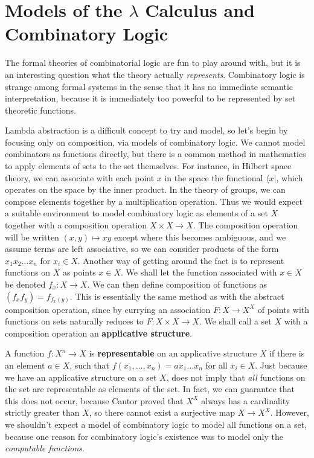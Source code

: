 \section{Models of the $\lambda$ Calculus and Combinatory Logic}

The formal theories of combinatorial logic are fun to play around with, but it is an interesting question what the theory actually {\it represents}. Combinatory logic is strange among formal systems in the sense that it has no immediate semantic interpretation, because it is immediately too powerful to be represented by set theoretic functions.

Lambda abstraction is a difficult concept to try and model, so let's begin by focusing only on composition, via models of combinatory logic. We cannot model combinators as functions directly, but there is a common method in mathematics to apply elements of sets to the set themselves. For instance, in Hilbert space theory, we can associate with each point $x$ in the space the functional $\langle x |$, which operates on the space by the inner product. In the theory of groups, we can compose elements together by a multiplication operation. Thus we would expect a suitable environment to model combinatory logic as elements of a set $X$ together with a composition operation $X \times X \to X$. The composition operation will be written $(x,y) \mapsto xy$ except where this becomes ambiguous, and we assume terms are left associative, so we can consider products of the form $x_1 x_2 \dots x_n$ for $x_i \in X$. Another way of getting around the fact is to represent functions on $X$ as points $x \in X$. We shall let the function associated with $x \in X$ be denoted $f_x : X \to X$. We can then define composition of functions as $(f_x f_y) = f_{f_x(y)}$. This is essentially the same method as with the abstract composition operation, since by currying an association $F: X \to X^X$ of points with functions on sets naturally reduces to $F: X \times X \to X$. We shall call a set $X$ with a composition operation an {\bf applicative structure}.

A function $f: X^n \to X$ is {\bf representable} on an applicative structure $X$ if there is an element $a \in X$, such that $f(x_1, \dots, x_n) = ax_1 \dots x_n$ for all $x_i \in X$. Just because we have an applicative structure on a set $X$, does not imply that {\it all} functions on the set are representable as elements of the set. In fact, we can guarantee that this does not occur, because Cantor proved that $X^X$ always has a cardinality strictly greater than $X$, so there cannot exist a surjective map $X \to X^X$. However, we shouldn't expect a model of combinatory logic to model all functions on a set, because one reason for combinatory logic's existence was to model only the {\it computable functions}.

